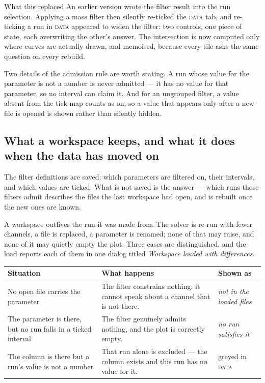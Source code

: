 \documentclass[11pt,a4paper,oneside]{report}
\newcommand{\tab}[1]{\textsc{#1}}
\begin{document}
\begin{aoenote}{What this replaced}
An earlier version wrote the filter result into the run selection. Applying a
mass filter then silently re-ticked the \tab{data} tab, and re-ticking a run in
\tab{data} appeared to widen the filter: two controls, one piece of state, each
overwriting the other's answer. The intersection is now computed only where
curves are actually drawn, and memoised, because every tile asks the same
question on every rebuild.
\end{aoenote}

Two details of the admission rule are worth stating. A run whose value for the
parameter is not a number is never admitted --- it has no value for that
parameter, so no interval can claim it. And for an ungrouped filter, a value
absent from the tick map counts as on, so a value that appears only after a new
file is opened is shown rather than silently hidden.

\subsection{What a workspace keeps, and what it does when the data has moved on}

The filter definitions are saved: which parameters are filtered on, their
intervals, and which values are ticked. What is not saved is the answer --- which
runs those filters admit describes the files the last workspace had open, and is
rebuilt once the new ones are known.

A workspace outlives the run it was made from. The solver is re-run with fewer
channels, a file is replaced, a parameter is renamed; none of that may raise, and
none of it may quietly empty the plot. Three cases are distinguished, and the
load reports each of them in one dialog titled \emph{Workspace loaded with
differences}.

\begin{center}
\small
\begin{tabular}{@{}p{}p{}p{}@{}}
\toprule
\textbf{Situation} & \textbf{What happens} & \textbf{Shown as} \\
\midrule
No open file carries the parameter & The filter constrains nothing: it cannot speak about a channel that is not there. & \emph{not in the loaded files} \\
\addlinespace
The parameter is there, but no run falls in a ticked interval & The filter genuinely admits nothing, and the plot is correctly empty. & \emph{no run satisfies it} \\
\addlinespace
The column is there but a run's value is not a number & That run alone is excluded --- the column exists and this run has no value for it. & greyed in \tab{data} \\
\bottomrule
\end{tabular}
\end{center}
\end{document}

